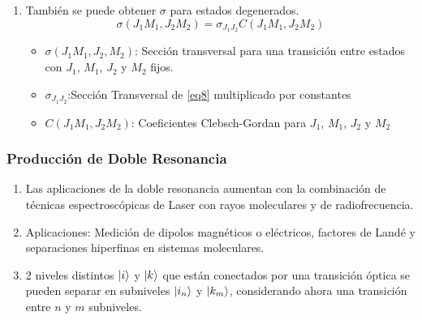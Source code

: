 \documentclass[aps,rmp,reprint,longbibliography]{revtex4-1}
\begin{document}
\begin{enumerate}
\item También se puede obtener $\sigma$ para estados degenerados.
\begin{equation}\label{eq9}\sigma(J_1M_1,J_2M_2)=\sigma_{J_1J_2}C(J_1M_1,J_2M_2)\end{equation}
\begin{itemize}
    \item $\sigma(J_1M_1,J_2,M_2)$: Sección transversal para una transición entre estados con $J_1$, $M_1$, $J_2$ y $M_2$ fijos.
    \item $\sigma_{J_1J_2}$:Sección Transversal de \ref{eq8} multiplicado por constantes
    \item $C(J_1M_1,J_2M_2)$: Coeficientes Clebsch-Gordan para $J_1$, $M_1$, $J_2$ y $M_2$
\end{itemize}
\end{enumerate}
\subsubsection{Producción de Doble Resonancia}
\begin{enumerate}
\item Las aplicaciones de la doble resonancia aumentan con la combinación de técnicas espectroscópicas de Laser con rayos moleculares y de radiofrecuencia.
\item Aplicaciones: Medición de dipolos magnéticos o eléctricos, factores de Landé y separaciones hiperfinas en sistemas moleculares. 
\item 2 niveles distintos $\ket{i}$ y $\ket{k}$ que están conectados por una transición óptica se pueden separar en subniveles $\ket{i_n}$ y $\ket{k_m}$, considerando ahora una transición entre $n$ y $m$ subniveles.
\end{enumerate}
\end{document}
